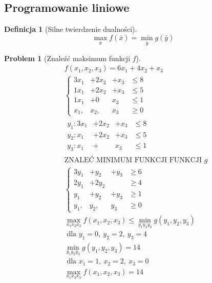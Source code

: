 \documentclass[a4paper,12pt]{article}
\theoremstyle{definition}%
\theoremstyle{definition}
\newtheorem{definition}{Definicja}%
\theoremstyle{problem}
\newtheorem*{problem*}{Problem}
\begin{document}
\subsection{Programowanie liniowe}
\begin{definition}[Silne twierdzenie dualności]
$$\max _{\bar{x}}f(\bar{x})=\min _{\bar{y}}g(\bar{y})$$
\end{definition}
\begin{problem*}[Znaleźć maksimum funkcji $f$]
\begin{align*}
&f(x_1,x_2,x_3)=6x_1+4x_2+x_3\\
&\left\{\begin{matrix}
3x_1 &+	2x_2 &+	x_3 &\leq 8\\
1x_1 &+	2x_2 &+	x_3 &\leq 5\\
1x_1 &+	0 &		x_3 &\leq 1\\
x_1, &	x_2, &	x_3	&\geq 0
\end{matrix}\right.\\
&\begin{matrix}
y_1:3x_1 &+	2x_2 &+	x_3 &\leq 8\\
y_2:x_1 &+	2x_2 &+ x_3 &\leq 5\\
y_3:x_1 &+		 &  x_3 &\leq 1
\end{matrix}\\
&\text{ZNALEĆ MINIMUM FUNKCJI FUNKCJI }g\\
&\left\{
\begin{matrix}
3y_1	&+ y_2	&+ y_3	&\geq 6\\
2y_1	&+ 2y_2	&& \geq 4\\
y_1		&+ y_2	&+ y_3	&\geq 1\\
y_1,	& y_2,	& y_3	&\geq 0
\end{matrix}
\right.\\
&\max _{x_1x_2x_3} f(x_1,x_2,x_3)\leq \min _{y_1y_2y_3} g(y_1,y_2,y_3)\\
&\text{ dla }y_1=0,\ y_2=2,\ y_3=4\\
&\min _{y_1y_2y_3} g(y_1,y_2,y_3)=14\\
&\text{ dla }x_1=1,\ x_2=2,\ x_3=0\\
&\max _{x_1x_2x_3} f(x_1,x_2,x_3)=14
\end{align*}
\end{problem*}
\end{document}
